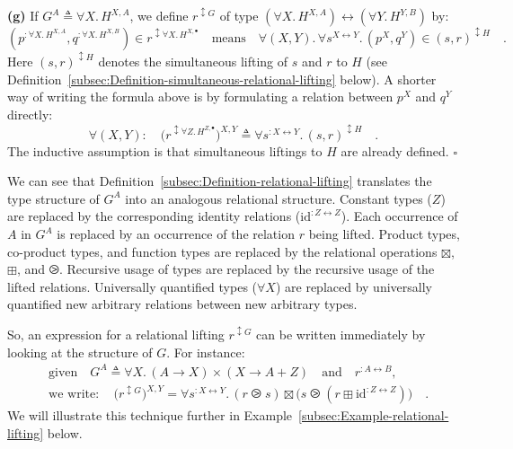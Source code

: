 \textbf{(g)} If $G^{A}\triangleq\forall X.\,H^{X,A}$, we define $r^{\updownarrow G}$
of type $(\forall X.\,H^{X,A})\leftrightarrow(\forall Y.\,H^{Y,B})$
by:
\[
(p^{:\forall X.\,H^{X,A}},q^{:\forall X.\,H^{X,B}})\in r^{\updownarrow\forall X.\,H^{X,\bullet}}\quad\text{means}\quad\forall(X,Y).\,\forall s^{X\leftrightarrow Y}.\,(p^{X},q^{Y})\in(s,r)^{\updownarrow H}\quad.
\]
Here $(s,r)^{\updownarrow H}$ denotes the simultaneous lifting of
$s$ and $r$ to $H$ (see Definition~\ref{subsec:Definition-simultaneous-relational-lifting}
below). A shorter way of writing the formula above is by formulating
a relation between $p^{X}$ and $q^{Y}$ directly:
\begin{equation}
\forall(X,Y):\quad\big(r^{\updownarrow\forall Z.\,H^{Z,\bullet}}\big)^{X,Y}\triangleq\forall s^{:X\leftrightarrow Y}.\,(s,r)^{\updownarrow H}\quad.\label{eq:relational-lifting-quantified-types-short}
\end{equation}
The inductive assumption is that simultaneous liftings to $H$ are
already defined. $\square$

We can see that Definition~\ref{subsec:Definition-relational-lifting}
translates the type structure of $G^{A}$ into an analogous relational
structure. Constant types ($Z$) are replaced by the corresponding
identity relations ($\text{id}^{:Z\leftrightarrow Z}$). Each occurrence
of $A$ in $G^{A}$ is replaced by an occurrence of the relation $r$
being lifted. Product types, co-product types, and function types
are replaced by the relational operations $\boxtimes$, $\boxplus$,
and $\ogreaterthan$. Recursive usage of types are replaced by the
recursive usage of the lifted relations. Universally quantified types
($\forall X$) are replaced by universally quantified new arbitrary
relations between new arbitrary types. 

So, an expression for a relational lifting $r^{\updownarrow G}$ can
be written immediately by looking at the structure of $G$. For instance:
\begin{align*}
 & \text{given}\quad G^{A}\triangleq\forall X.\,\left(A\rightarrow X\right)\times\left(X\rightarrow A+Z\right)\quad\text{and}\quad r^{:A\leftrightarrow B},\\
 & \text{we write}:\quad\big(r^{\updownarrow G}\big)^{X,Y}=\forall s^{:X\leftrightarrow Y}.\,(r\ogreaterthan s)\boxtimes\big(s\ogreaterthan(r\boxplus\text{id}^{:Z\leftrightarrow Z})\big)\quad.
\end{align*}
 We will illustrate this technique further in Example~\ref{subsec:Example-relational-lifting}
below.

